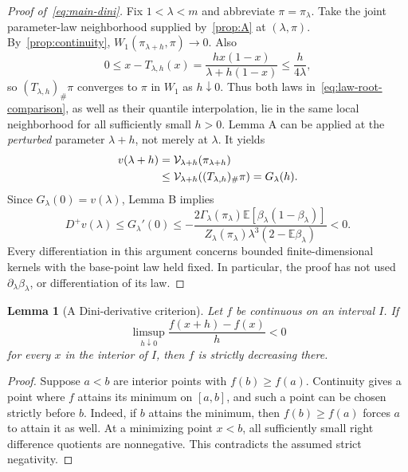 \documentclass[11pt,a4paper]{article}
\numberwithin{equation}{section}
\theoremstyle{plain}
\newtheorem{lemma}[lemma]{Lemma}
\theoremstyle{definition}
\theoremstyle{remark}
\newcommand{\E}{\mathbb E}
\newcommand{\V}{\mathcal V}
\newcommand{\Dini}{D^{+}}
\begin{document}
\begin{proof}[Proof of~\eqref{eq:main-dini}]
Fix $1<\lambda<m$ and abbreviate $\pi=\pi_\lambda$.  Take the joint
parameter-law neighborhood supplied by~\cref{prop:A} at $(\lambda,\pi)$.
By~\cref{prop:continuity},
$W_1(\pi_{\lambda+h},\pi)\to0$.  Also
\begin{equation}
 0\le x-T_{\lambda,h}(x)
 =\frac{h x(1-x)}{\lambda+h(1-x)}\le\frac h{4\lambda},
\end{equation}
so $(T_{\lambda,h})_\#\pi$ converges to $\pi$ in $W_1$ as $h\downarrow0$.
Thus both laws in~\eqref{eq:law-root-comparison}, as well as their
quantile interpolation, lie in the same local neighborhood for all
sufficiently small $h>0$.  Lemma A can be applied at the \emph{perturbed}
parameter $\lambda+h$, not merely at $\lambda$.  It yields
\begin{align}\label{eq:closing-comparison}
 v(\lambda+h)
 &=\V_{\lambda+h}(\pi_{\lambda+h})\notag\\
 &\le\V_{\lambda+h}((T_{\lambda,h})_\#\pi)
 =G_\lambda(h).
\end{align}
Since $G_\lambda(0)=v(\lambda)$, Lemma B implies
\begin{equation}\label{eq:quantitative-dini}
 \Dini v(\lambda)
 \le G_\lambda'(0)
 \le-\frac{2\Gamma_\lambda(\pi_\lambda)
                  \E[\beta_\lambda(1-\beta_\lambda)]}
 {Z_\lambda(\pi_\lambda)\lambda^3(2-\E\beta_\lambda)}<0.
\end{equation}
Every differentiation in this argument concerns bounded finite-dimensional
kernels with the base-point law held fixed.  In particular, the proof
has not used $\partial_\lambda\beta_\lambda$, or differentiation of its law.
\end{proof}

\begin{lemma}[A Dini-derivative criterion]\label{lem:dini}
Let $f$ be continuous on an interval $I$.  If
\begin{equation}
 \limsup_{h\downarrow0}\frac{f(x+h)-f(x)}h<0
\end{equation}
for every $x$ in the interior of $I$, then $f$ is strictly decreasing
there.
\end{lemma}
\begin{proof}
Suppose $a<b$ are interior points with $f(b)\ge f(a)$.  Continuity gives
a point where $f$ attains its minimum on $[a,b]$, and such a point can
be chosen strictly before $b$.  Indeed, if $b$ attains the minimum, then
$f(b)\ge f(a)$ forces $a$ to attain it as well.  At a minimizing point
$x<b$, all sufficiently small right difference quotients are nonnegative.
This contradicts the assumed strict negativity.
\end{proof}
\end{document}
